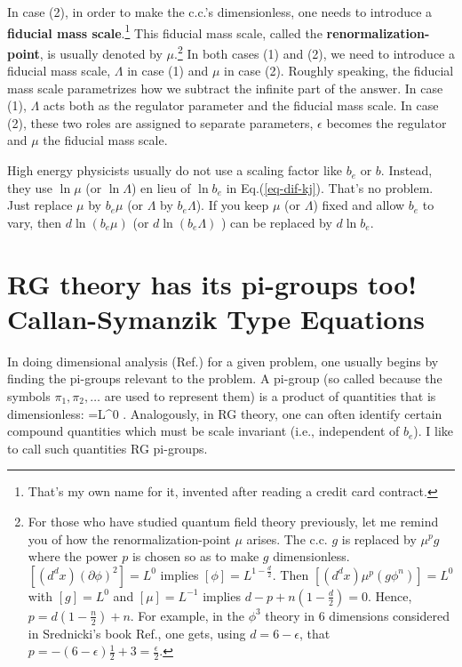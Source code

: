 \documentclass[12pt]{article}
\begin{document}
In case (2), in order to make
the c.c.'s dimensionless,
one needs to introduce a
\textbf{fiducial mass scale}.\footnote{
That's my own name for it, invented
after reading a credit card contract.}
This fiducial mass scale,
called
the \textbf{renormalization-point},
is usually denoted by $\mu$.\footnote{
For those who have studied quantum
field theory previously, let me remind
you of how the
renormalization-point $\mu$ arises.
The c.c. $g$
is replaced by $\mu^p g$
where the power $p$
is chosen so as to make $g$
dimensionless.
$[(d^dx) (\partial \phi)^2]=L^0$
implies $[\phi]= L^{1-\frac{d}{2}}$. Then
$[(d^dx)  \mu^p (g\phi^n)] = L^0$ with
$[g]=L^0$ and $[\mu]=L^{-1}$
implies $d -p +n(1-\frac{d}{2})=0$.
Hence, $p=d(1-\frac{n}{2}) + n$.
For example, in the $\phi^3$
theory in 6 dimensions considered
in Srednicki's book Ref.\cite{Sr},
one gets, using $d = 6-\epsilon$, that
$p= -(6-\epsilon)\frac{1}{2} + 3
= \frac{\epsilon}{2}$.}
In both cases (1) and (2), we need to
introduce a fiducial mass scale,
$\Lambda$ in case (1) and $\mu$ in case (2).
Roughly speaking,
the fiducial mass scale
parametrizes
how we
subtract the infinite
part of the answer.
In case (1),
$\Lambda$ acts both as
the regulator parameter and
the fiducial mass scale.
In case (2), these
two roles are assigned to
separate parameters, $\epsilon$
becomes the regulator and
$\mu$ the fiducial mass scale.

High energy physicists
usually do not use a scaling factor
like $b_e$ or $b$. Instead, they
use $\ln \mu$ (or $\ln \Lambda$)
en lieu of $\ln b_e$
in Eq.(\ref{eq-dif-kj}).
That's no problem. Just replace
$\mu$ by $b_e \mu$ (or
$\Lambda$ by $b_e \Lambda$).
If you keep $\mu$
(or $\Lambda$) fixed and
allow $b_e$ to vary, then
$d\ln(b_e\mu)$ (or $d\ln(b_e\Lambda)$ )
can be replaced by $d\ln b_e$.

\section{RG theory has its pi-groups too!
Callan-Symanzik Type Equations}

In doing dimensional
analysis (Ref.\cite{wiki-da})
for a given problem, one
usually begins by finding the
 pi-groups relevant to the
problem. A pi-group (so called
because the symbols $\pi_1, \pi_2, \ldots$
are used to represent them)
is a product
of quantities that is dimensionless:
=L^0
\;.
\eeq
Analogously, in RG theory, one
can often identify certain compound
quantities which must be scale
invariant (i.e., independent
of $b_e$).
I like to call such
quantities RG pi-groups.
\end{document}
